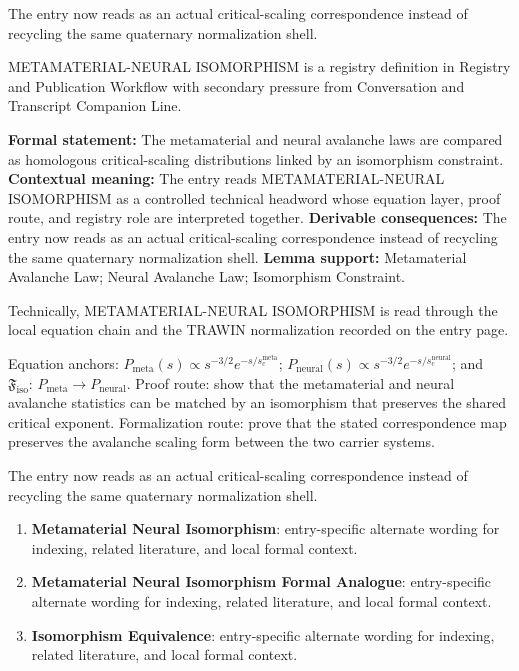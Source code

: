 The entry now reads as an actual critical-scaling correspondence instead of recycling the same quaternary normalization shell.
\clearpage


\begingroup\small
{}
METAMATERIAL-NEURAL ISOMORPHISM is a registry definition in Registry and Publication Workflow with secondary pressure from Conversation and Transcript Companion Line.

\begingroup\footnotesize\setlength{\emergencystretch}{3em}\sloppy
\textbf{Formal statement:} The metamaterial and neural avalanche laws are compared as homologous critical-scaling distributions linked by an isomorphism constraint. \textbf{Contextual meaning:} The entry reads METAMATERIAL-NEURAL ISOMORPHISM as a controlled technical headword whose equation layer, proof route, and registry role are interpreted together. \textbf{Derivable consequences:} The entry now reads as an actual critical-scaling correspondence instead of recycling the same quaternary normalization shell. \textbf{Lemma support:} Metamaterial Avalanche Law; Neural Avalanche Law; Isomorphism Constraint.\par
\endgroup

Technically, METAMATERIAL-NEURAL ISOMORPHISM is read through the local equation chain and the TRAWIN normalization recorded on the entry page.

Equation anchors: \(P_{\mathrm{meta}}(s)\propto s^{-3/2}e^{-s/s_{\mathrm{c}}^{\mathrm{meta}}}\); \(P_{\mathrm{neural}}(s)\propto s^{-3/2}e^{-s/s_{\mathrm{c}}^{\mathrm{neural}}}\); and \(\mathfrak{F}_{\mathrm{iso}}:\,P_{\mathrm{meta}}\to P_{\mathrm{neural}}\). Proof route: show that the metamaterial and neural avalanche statistics can be matched by an isomorphism that preserves the shared critical exponent. Formalization route: prove that the stated correspondence map preserves the avalanche scaling form between the two carrier systems.

The entry now reads as an actual critical-scaling correspondence instead of recycling the same quaternary normalization shell.
\endgroup

\begin{enumerate}[leftmargin=1.6em,itemsep=6pt,topsep=4pt]
\item \textbf{Metamaterial Neural Isomorphism}: entry-specific alternate wording for indexing, related literature, and local formal context.
\item \textbf{Metamaterial Neural Isomorphism Formal Analogue}: entry-specific alternate wording for indexing, related literature, and local formal context.
\item \textbf{Isomorphism Equivalence}: entry-specific alternate wording for indexing, related literature, and local formal context.
\end{enumerate}

